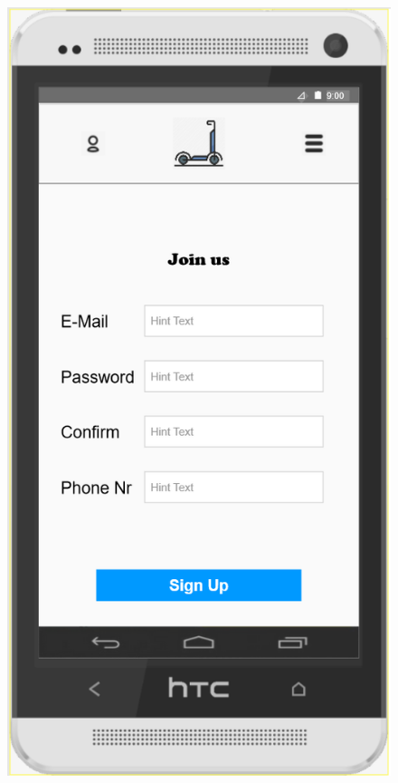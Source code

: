 \documentclass[a4paper, 12pt]{article}
\begin{document}
\begin{figure} [htbp]
    \begin{center}
        \begin{minipage}{0.45\textwidth}
            \begin{center}
                \includegraphics[scale=0.65]{images/prototypes/04-register-sign-up.png}

\end{center}
\end{minipage}
\end{center}
\end{figure}
\end{document}
